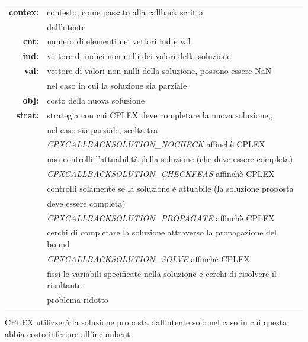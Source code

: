 \begin{table}[h]
\centering
\begin{tabular}{rl}
\textbf{contex:} & {contesto, come passato alla callback scritta}\\
&{dall'utente}\\
\textbf{cnt:} & {numero di elementi nei vettori ind e val}\\
\textbf{ind:} & {vettore di indici non nulli dei valori della soluzione}\\
\textbf{val:} & {vettore di valori non nulli della soluzione, possono essere NaN}\\
&{nel caso in cui la soluzione sia parziale}\\
\textbf{obj:} & {costo della nuova soluzione}\\
\textbf{strat:} & {strategia con cui CPLEX deve completare la nuova soluzione,,}\\
&{ nel caso sia parziale, scelta tra}\\
&{\textit{CPXCALLBACKSOLUTION\_NOCHECK} affinchè CPLEX}\\ 
&{non controlli l'attuabilità della soluzione (che deve essere completa) }\\
&{\textit{CPXCALLBACKSOLUTION\_CHECKFEAS} affinchè CPLEX}\\
&{ controlli solamente se la soluzione è attuabile (la soluzione proposta }\\
&{deve essere completa)}\\
&{\textit{CPXCALLBACKSOLUTION\_PROPAGATE} affinchè CPLEX }\\
&{cerchi di completare la soluzione attraverso la propagazione del bound}\\
&{\textit{CPXCALLBACKSOLUTION\_SOLVE} affinchè CPLEX}\\ 
&{fissi le variabili specificate nella soluzione e cerchi di risolvere il risultante }\\
&{problema ridotto}\\
\end{tabular}
\end{table}
CPLEX utilizzerà la soluzione proposta dall'utente solo nel caso in cui questa abbia costo inferiore all'incumbent.

